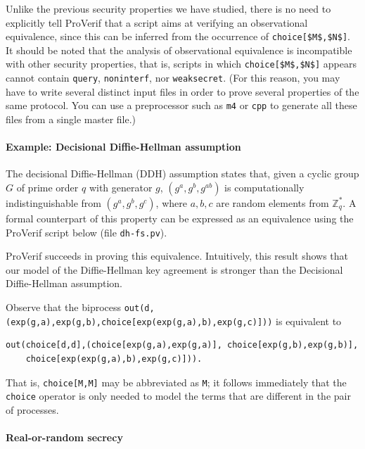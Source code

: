\documentclass{book}
\begin{document}
Unlike the previous security properties we have studied, there is no need to explicitly tell ProVerif that a script aims at verifying an observational equivalence, since this can be inferred from the occurrence of \lstinline!choice[$M$,$N$]!. It should be noted that the analysis of observational equivalence is incompatible with other security properties, that is, scripts in which \lstinline!choice[$M$,$N$]! appears cannot contain \lstinline!query!, \lstinline!noninterf!, nor \lstinline!weaksecret!. (For this reason, you may have to write several distinct input files in order to prove several properties of the same protocol. You can use a preprocessor such as {\tt m4} or {\tt cpp} to generate all these files from a single master file.)

\paragraph{Example: Decisional Diffie-Hellman assumption}

The decisional Diffie-Hellman (DDH) assumption states that, given a cyclic group $G$ of prime order $q$ with generator $g$, $(g^a,g^b,g^{ab})$ is computationally indistinguishable from $(g^a,g^b,g^c)$, where $a,b,c$ are random elements from $\mathbb{Z}^*_q$. A formal counterpart of this property can be expressed as an equivalence using the ProVerif script below (file \texttt{{\docexdir}dh-fs.pv}).
%

%
ProVerif succeeds in proving this equivalence. Intuitively, this result shows
that our model of the Diffie-Hellman key agreement is stronger than the
Decisional Diffie-Hellman assumption.

Observe that the biprocess
\lstinline!out(d,(exp(g,a),exp(g,b),choice[exp(exp(g,a),b),exp(g,c)]))!
is equivalent to
\begin{lstlisting}[numbers=none]
  out(choice[d,d],(choice[exp(g,a),exp(g,a)], choice[exp(g,b),exp(g,b)],
    choice[exp(exp(g,a),b),exp(g,c)])).
\end{lstlisting}
That is, \lstinline!choice[M,M]! may be abbreviated as \lstinline!M!; it follows immediately that the \lstinline!choice! operator is only needed to model the terms that are different in the pair of processes.

\paragraph{Real-or-random secrecy}\label{page:realorrandom}
\end{document}
